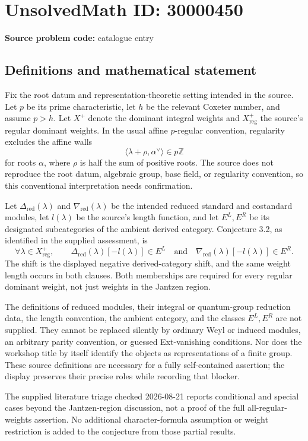 \documentclass[11pt]{article}
\newcommand{\Z}{\mathbb{Z}}
\begin{document}
\section*{UnsolvedMath ID: 30000450}
\textbf{Source problem code:} catalogue entry
\subsection{Definitions and mathematical statement}
Fix the root datum and representation-theoretic setting intended in the source. Let \(p\) be its prime characteristic, let \(h\) be the relevant Coxeter number, and assume \(p>h\). Let \(X^+\) denote the dominant integral weights and \(X^+_{\mathrm{reg}}\) the source's regular dominant weights. In the usual affine \(p\)-regular convention, regularity excludes the affine walls
\[
\langle\lambda+\rho,\alpha^\vee\rangle\in p\Z
\]
for roots \(\alpha\), where \(\rho\) is half the sum of positive roots. The source does not reproduce the root datum, algebraic group, base field, or regularity convention, so this conventional interpretation needs confirmation.

Let \(\Delta_{\mathrm{red}}(\lambda)\) and \(\nabla_{\mathrm{red}}(\lambda)\) be the intended reduced standard and costandard modules, let \(l(\lambda)\) be the source's length function, and let \(E^L,E^R\) be its designated subcategories of the ambient derived category. Conjecture 3.2, as identified in the supplied assessment, is
\[
\forall\lambda\in X^+_{\mathrm{reg}},\qquad
\Delta_{\mathrm{red}}(\lambda)[-l(\lambda)]\in E^L
\quad\text{and}\quad
\nabla_{\mathrm{red}}(\lambda)[-l(\lambda)]\in E^R.
\]
The shift is the displayed negative derived-category shift, and the same weight length occurs in both clauses. Both memberships are required for every regular dominant weight, not just weights in the Jantzen region.

The definitions of reduced modules, their integral or quantum-group reduction data, the length convention, the ambient category, and the classes \(E^L,E^R\) are not supplied. They cannot be replaced silently by ordinary Weyl or induced modules, an arbitrary parity convention, or guessed Ext-vanishing conditions. Nor does the workshop title by itself identify the objects as representations of a finite group. These source definitions are necessary for a fully self-contained assertion; the display preserves their precise roles while recording that blocker.

The supplied literature triage checked 2026-08-21 reports conditional and special cases beyond the Jantzen-region discussion, not a proof of the full all-regular-weights assertion. No additional character-formula assumption or weight restriction is added to the conjecture from those partial results.
\end{document}
